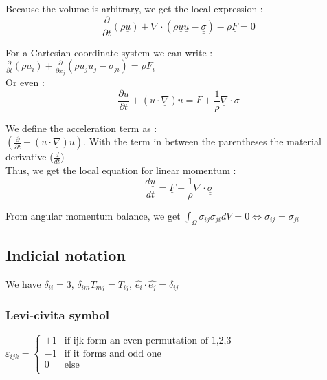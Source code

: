 \documentclass[../main.tex]{subfiles}
\begin{document}
Because the volume is arbitrary, we get the local expression :\\
\begin{equation}
    \frac{\partial}{\partial t} (\rho \underline{u}) + \underline{\nabla}\cdot (\rho \underline{u} \underline{u}-\underline{\underline{\sigma}}) - \rho \underline{F} =0
\end{equation}

For a Cartesian coordinate system we can write : $\frac{\partial}{\partial t}(\rho u_i) + \frac{\partial}{\partial x_j}(\rho u_j u_j - \sigma_{ji}) = \rho F_i$\\

Or even : \\
\begin{equation}
    \frac{\partial \underline{u}}{\partial t} + (\underline{u}\cdot \underline{\nabla})\underline{u} = \underline{F} + \frac{1}{\rho} \underline{\nabla}\cdot \underline{\underline{\sigma}}
\end{equation}

We define the acceleration term as :\\
$(\frac{\partial }{\partial t} + (\underline{u}\cdot \underline{\nabla}) \underline{u})$. With the term in between the parentheses the material derivative ($\frac{d}{dt}$)\\

Thus, we get the local equation for linear momentum : \\
\begin{equation}
    \frac{d \underline{u}}{dt} = \underline{F} + \frac{1}{\rho} \underline{\nabla}\cdot \underline{\underline{\sigma}}
\end{equation}


From angular momentum balance, we get $\int_\Omega \sigma_{ij}\sigma_{ji}dV = 0 \Leftrightarrow \sigma_{ij} = \sigma_{ji}$\\

\subsection{Indicial notation}
We have $\delta_{ii} = 3$, $\delta_{im} T_{mj} = T_{ij}$, $\hat{e_i} \cdot \hat{e_j} = \delta_{ij}$\\

\subsubsection{Levi-civita symbol}
$\varepsilon_{ijk} = \begin{cases}+1 & \text{if ijk form an even permutation of 1,2,3} \\
-1 & \text{if it forms and odd one}\\
0 & \text{else}\\
\end{cases}$\\
\end{document}
